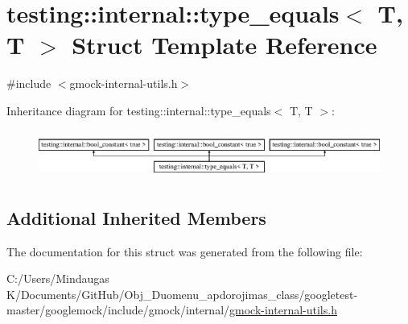 \hypertarget{structtesting_1_1internal_1_1type__equals_3_01_t_00_01_t_01_4}{}\section{testing\+::internal\+::type\+\_\+equals$<$ T, T $>$ Struct Template Reference}
\label{structtesting_1_1internal_1_1type__equals_3_01_t_00_01_t_01_4}


{\ttfamily \#include $<$gmock-\/internal-\/utils.\+h$>$}

Inheritance diagram for testing\+::internal\+::type\+\_\+equals$<$ T, T $>$\+:\begin{figure}[H]
\begin{center}
\leavevmode
\includegraphics[height=1.595442cm]{da/d8f/structtesting_1_1internal_1_1type__equals_3_01_t_00_01_t_01_4}
\end{center}
\end{figure}
\subsection*{Additional Inherited Members}


The documentation for this struct was generated from the following file\+:\begin{DoxyCompactItemize}
\item 
C\+:/\+Users/\+Mindaugas K/\+Documents/\+Git\+Hub/\+Obj\+\_\+\+Duomenu\+\_\+apdorojimas\+\_\+class/googletest-\/master/googlemock/include/gmock/internal/\mbox{\hyperlink{googletest-master_2googlemock_2include_2gmock_2internal_2gmock-internal-utils_8h}{gmock-\/internal-\/utils.\+h}}\end{DoxyCompactItemize}
